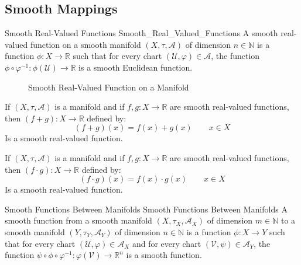         \subsection{Smooth Mappings}
            \begin{fdefinition}{Smooth Real-Valued Functions}
                               {Smooth_Real_Valued_Functions}
                A smooth real-valued function on a smooth manifold
                $(X,\tau,\mathcal{A})$ of dimension $n\in\mathbb{N}$ is a
                function $\phi:X\rightarrow\mathbb{R}$ such that for every
                chart $(\mathcal{U},\varphi)\in\mathcal{A}$, the function
                $\phi\circ\varphi^{\minus{1}}:\phi(\mathcal{U})%
                 \rightarrow\mathbb{R}$ is a smooth Euclidean function.
            \end{fdefinition}
            \begin{figure}[H]
                \centering
                \captionsetup{type=figure}
                
                \caption{Smooth Real-Valued Function on a Manifold}
            \end{figure}
            \begin{theorem}
                If $(X,\tau,\mathcal{A})$ is a manifold and if
                $f,g:X\rightarrow\mathbb{R}$ are smooth real-valued functions,
                then $(f+g):X\rightarrow\mathbb{R}$ defined by:
                \begin{equation}
                    (f+g)(x)=f(x)+g(x)
                    \quad\quad
                    x\in{X}
                \end{equation}
                Is a smooth real-valued function.
            \end{theorem}
            \begin{theorem}
                If $(X,\tau,\mathcal{A})$ is a manifold and if
                $f,g:X\rightarrow\mathbb{R}$ are smooth real-valued functions,
                then $(f\cdot{g}):X\rightarrow\mathbb{R}$ defined by:
                \begin{equation}
                    (f\cdot{g})(x)=f(x)\cdot{g}(x)
                    \quad\quad
                    x\in{X}
                \end{equation}
                Is a smooth real-valued function.
            \end{theorem}
            \begin{fdefinition}{Smooth Functions Between Manifolds}
                               {Smooth Functions Between Manifolds}
                A smooth function from a smooth manifold
                $(X,\tau_{X},\mathcal{A}_{X})$ of dimension $m\in\mathbb{N}$
                to a smooth manifold $(Y,\tau_{Y},\mathcal{A}_{Y})$ of
                dimension $n\in\mathbb{N}$ is a function
                $\phi:X\rightarrow{Y}$ such that for every chart
                $(\mathcal{U},\varphi)\in\mathcal{A}_{X}$ and for every
                chart $(\mathcal{V},\psi)\in\mathcal{A}_{Y}$, the function
                $\psi\circ\phi\circ\varphi^{\minus{1}}:\varphi(\mathcal{V})%
                 \rightarrow\mathbb{R}^{n}$ is a smooth function.
            \end{fdefinition}
